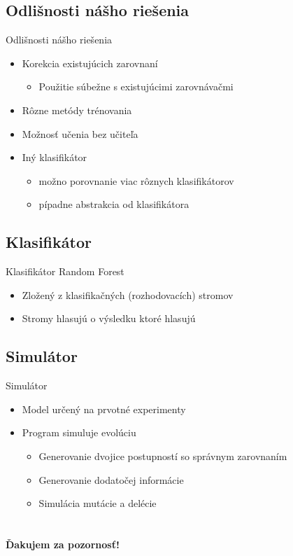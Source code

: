 \documentclass[xcolor=dvipsnames, compress, 12pt]{beamer}
\begin{document}
\subsection{Odlišnosti nášho riešenia}
\begin{frame}{Odlišnosti nášho riešenia}
  \begin{itemize}
    \item Korekcia existujúcich zarovnaní
    \begin{itemize}
      \item Použitie súbežne s existujúcimi zarovnávačmi
    \end{itemize}
    \item Rôzne metódy trénovania
    \item Možnosť učenia bez učiteľa
    \item Iný klasifikátor
    \begin{itemize}
      \item možno porovnanie viac rôznych klasifikátorov
      \item pípadne abstrakcia od klasifikátora
    \end{itemize} 
  \end{itemize} 
\end{frame}

\subsection{Klasifikátor}
\begin{frame}{Klasifikátor}
Random Forest
  \begin{itemize}
    \item Zložený z klasifikačných (rozhodovacích) stromov
    \item Stromy hlasujú o výsledku ktoré hlasujú
  \end{itemize} 
\end{frame}

\subsection{Simulátor}
\begin{frame}{Simulátor}
  \begin{itemize}
    \item Model určený na prvotné experimenty
    \item Program simuluje evolúciu
    \begin{itemize}
      \item Generovanie dvojice postupností so správnym zarovnaním
      \item Generovanie dodatočej informácie
      \item Simulácia mutácie a delécie
    \end{itemize} 
  \end{itemize} 
\end{frame}


\section{}
\begin{frame}[plain]
  \transdissolve[duration=5]
  \begin{center}
  \textbf{\color{Green} \LARGE Ďakujem za pozornosť!} 
  \end{center}  
\end{frame}
\end{document}

